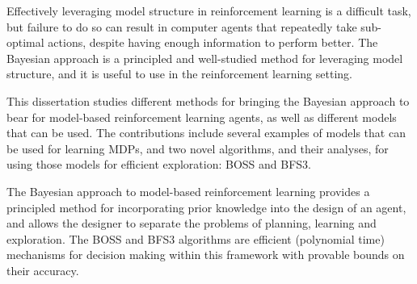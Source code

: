 Effectively leveraging model structure in reinforcement learning is a difficult task, but failure to do so can result in computer agents that repeatedly take sub-optimal actions, despite having enough information to perform better. The Bayesian approach is a principled and well-studied method for leveraging model structure, and it is useful to use in the reinforcement learning setting.

This dissertation studies different methods for bringing the Bayesian approach to bear for model-based reinforcement learning agents, as well as different models that can be used. The contributions include several examples of models that can be used for learning MDPs, and two novel algorithms, and their analyses, for using those models for efficient exploration: BOSS and BFS3.

The Bayesian approach to model-based reinforcement learning provides a principled method for incorporating prior knowledge into the design of an agent, and allows the designer to separate the problems of planning, learning and exploration.  The BOSS and BFS3 algorithms are efficient (polynomial time) mechanisms for decision making within this framework with provable bounds on their accuracy. 
